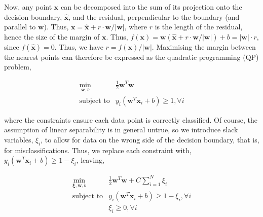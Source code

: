 \documentclass[11pt]{amsart}
\begin{document}
Now, any point $\mathbf{x}$ can be decomposed into the sum of its projection onto the decision boundary, $\hat{\mathbf{x}}$, and the residual, perpendicular to the boundary (and parallel to $\mathbf{w}$). Thus, $\mathbf{x} = \hat{\mathbf{x}} + r\cdot\mathbf{w}/|\mathbf{w}|$, where $r$ is the length of the residual, hence the size of the margin of $\mathbf{x}$. Thus, $f(\mathbf{x}) = \mathbf{w}(\hat{\mathbf{x}} + r\cdot\mathbf{w}/|\mathbf{w}|) + b =  |\mathbf{w}|\cdot r$, since $f(\hat{\mathbf{x}}) = 0$. Thus, we have $r = f(\mathbf{x})/|\mathbf{w}|$. Maximising the margin between the nearest points can therefore be expressed as the quadratic programming (QP) problem,

$$
\begin{array}{rl}
\min_{\mathbf{w}, b} & \frac{1}{2}\mathbf{w}^T\mathbf{w} \\
\text{subject to} & y_i(\mathbf{w}^T\mathbf{x}_i + b) \geq 1, \forall i
\end{array}
$$

where the constraints ensure each data point is correctly classified. Of course, the assumption of linear separability is in general untrue, so we introduce slack variables, $\xi_i$, to allow for data on the wrong side of the decision boundary, that is, for misclassifications. Thus, we replace each constraint with, $y_i(\mathbf{w}^T\mathbf{x}_i + b) \geq 1 - \xi_i$, leaving,

$$
\begin{array}{rl}
\min_{\boldsymbol\xi, \mathbf{w}, b} & \frac{1}{2}\mathbf{w}^T\mathbf{w} + C\sum_{i = 1}^{N}\xi_i \\
\text{subject to} & y_i(\mathbf{w}^T\mathbf{x}_i + b) \geq 1 - \xi_i, \forall i \\
& \xi_i \geq 0, \forall i
\end{array}
$$

\end{document}
